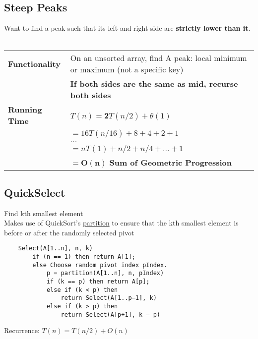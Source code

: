 \documentclass{article}
\begin{document}
    \subsection{Steep Peaks}

    Want to find a peak such that its left and right side are \textbf{strictly lower than it}.\\\\

    \begin{tabular}{ll}
        \toprule
        \textbf{Functionality} & On an unsorted array, find A peak: local minimum or maximum (not a specific key)\\
        & \textbf{If both sides are the same as mid, recurse both sides}\\
        \midrule
        \textbf{Running Time} & $T(n) = $\textbf{2}$T(n/2) + \theta(1)$\\
        & $ = 16T(n/16) + 8  + 4 + 2 + 1$\\
        & $...$\\
        & $ = nT(1) + n/2 + n/4 + ... + 1$ \\
        & $\bm{ = O(n)}$ \textbf{Sum of Geometric Progression}\\
        \bottomrule
    \end{tabular}

    \pagebreak

    \subsection{QuickSelect}

    Find kth smallest element\\

    \noindent Makes use of QuickSort's \hyperref[partition]{partition} to ensure that the kth smallest element 
    is before or after the randomly selected pivot

    \begin{verbatim}
    Select(A[1..n], n, k)
        if (n == 1) then return A[1];
        else Choose random pivot index pIndex.
            p = partition(A[1..n], n, pIndex)
            if (k == p) then return A[p];
            else if (k < p) then
                return Select(A[1..p–1], k)
            else if (k > p) then
                return Select(A[p+1], k – p)
    \end{verbatim}

    \noindent Recurrence: $T(n) = T(n/2) + O(n)$\\
\end{document}

